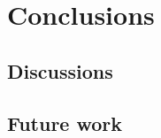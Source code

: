 \chapter{Conclusions}
\label{conclusions}

\section{Discussions}
\label{sec:7_discussion}

\section{Future work}
\label{sec:7_futurework}